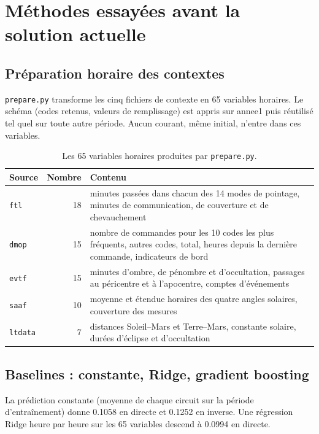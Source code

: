 \documentclass[11pt,a4paper]{article}
\newcommand{\code}[1]{\texttt{#1}}
\begin{document}
\section{Méthodes essayées avant la solution actuelle}

\subsection{Préparation horaire des contextes}

\code{prepare.py} transforme les cinq fichiers de contexte en 65 variables horaires. Le schéma (codes retenus, valeurs de remplissage) est appris sur annee1 puis réutilisé tel quel sur toute autre période. Aucun courant, même initial, n'entre dans ces variables.

\begin{table}[!htb]
\centering\small
\caption{Les 65 variables horaires produites par \code{prepare.py}.}
\label{tab:variables}
\begin{tabularx}{\linewidth}{l r X}
\toprule
Source & Nombre & Contenu \\
\midrule
\code{ftl}    & 18 & minutes passées dans chacun des 14 modes de pointage, minutes de communication, de couverture et de chevauchement \\
\code{dmop}   & 15 & nombre de commandes pour les 10 codes les plus fréquents, autres codes, total, heures depuis la dernière commande, indicateurs de bord \\
\code{evtf}   & 15 & minutes d'ombre, de pénombre et d'occultation, passages au péricentre et à l'apocentre, comptes d'événements \\
\code{saaf}   & 10 & moyenne et étendue horaires des quatre angles solaires, couverture des mesures \\
\code{ltdata} & 7  & distances Soleil--Mars et Terre--Mars, constante solaire, durées d'éclipse et d'occultation \\
\bottomrule
\end{tabularx}
\end{table}

\subsection{Baselines : constante, Ridge, gradient boosting}

La prédiction constante (moyenne de chaque circuit sur la période d'entraînement) donne 0.1058 en directe et 0.1252 en inverse. Une régression Ridge heure par heure sur les 65 variables descend à 0.0994 en directe.
\end{document}
